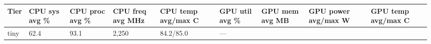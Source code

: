 \documentclass[
  9pt, a4paper, landscape]{article}
\begin{document}
\begin{longtable}[]{@{}lllllllll@{}}
\toprule
\begin{minipage}[b]{0.08\columnwidth}\raggedright
Tier\strut
\end{minipage} & \begin{minipage}[b]{0.08\columnwidth}\raggedright
CPU sys avg \%\strut
\end{minipage} & \begin{minipage}[b]{0.08\columnwidth}\raggedright
CPU proc avg \%\strut
\end{minipage} & \begin{minipage}[b]{0.08\columnwidth}\raggedright
CPU freq avg MHz\strut
\end{minipage} & \begin{minipage}[b]{0.08\columnwidth}\raggedright
CPU temp avg/max C\strut
\end{minipage} & \begin{minipage}[b]{0.08\columnwidth}\raggedright
GPU util avg \%\strut
\end{minipage} & \begin{minipage}[b]{0.08\columnwidth}\raggedright
GPU mem avg MB\strut
\end{minipage} & \begin{minipage}[b]{0.08\columnwidth}\raggedright
GPU power avg/max W\strut
\end{minipage} & \begin{minipage}[b]{0.08\columnwidth}\raggedright
GPU temp avg/max C\strut
\end{minipage}\tabularnewline
\midrule
\endhead
\begin{minipage}[t]{0.08\columnwidth}\raggedright
tiny\strut
\end{minipage} & \begin{minipage}[t]{0.08\columnwidth}\raggedright
62.4\strut
\end{minipage} & \begin{minipage}[t]{0.08\columnwidth}\raggedright
93.1\strut
\end{minipage} & \begin{minipage}[t]{0.08\columnwidth}\raggedright
2,250\strut
\end{minipage} & \begin{minipage}[t]{0.08\columnwidth}\raggedright
84.2/85.0\strut
\end{minipage} & \begin{minipage}[t]{0.08\columnwidth}\raggedright
---\strut
\end{minipage} & \begin{minipage}[t]{0.08\columnwidth}\raggedright

\end{minipage}
\end{longtable}
\end{document}
